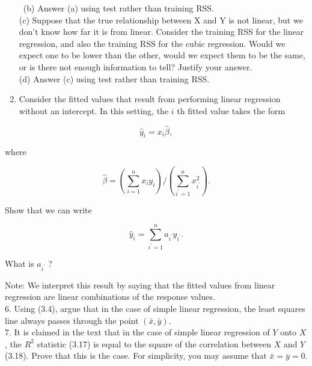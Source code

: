 \documentclass[10pt]{article}
\begin{document}
\begin{enumerate}
\
(b) Answer (a) using test rather than training RSS.\\
(c) Suppose that the true relationship between X and Y is not linear, but we don't know how far it is from linear. Consider the training RSS for the linear regression, and also the training RSS for the cubic regression. Would we expect one to be lower than the other, would we expect them to be the same, or is there not enough information to tell? Justify your answer.\\
(d) Answer (c) using test rather than training RSS.
  \item Consider the fitted values that result from performing linear regression without an intercept. In this setting, the $i$ th fitted value takes the form
\end{enumerate}

$$
\hat{y}_{i}=x_{i} \hat{\beta},
$$

where


\begin{equation*}
\hat{\beta}=\left(\sum_{i=1}^{n} x_{i} y_{i}\right) /\left(\sum_{i^{\prime}=1}^{n} x_{i^{\prime}}^{2}\right) . \tag{3.38}
\end{equation*}


Show that we can write

$$
\hat{y}_{i}=\sum_{i^{\prime}=1}^{n} a_{i^{\prime}} y_{i^{\prime}} .
$$

What is $a_{i^{\prime}}$ ?

Note: We interpret this result by saying that the fitted values from linear regression are linear combinations of the response values.\\
6. Using (3.4), argue that in the case of simple linear regression, the least squares line always passes through the point $(\bar{x}, \bar{y})$.\\
7. It is claimed in the text that in the case of simple linear regression of $Y$ onto $X$, the $R^{2}$ statistic (3.17) is equal to the square of the correlation between $X$ and $Y$ (3.18). Prove that this is the case. For simplicity, you may assume that $\bar{x}=\bar{y}=0$.
\end{document}
